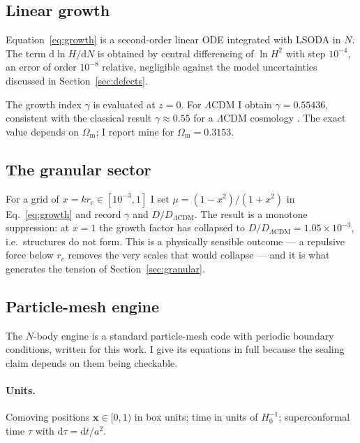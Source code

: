 \documentclass[11pt,a4paper]{article}
\theoremstyle{definition}
\newcommand{\Omm}{\Omega_{\mathrm{m}}}
\newcommand{\gamm}{\gamma}
\begin{document}
\subsection{Linear growth}

Equation~\eqref{eq:growth} is a second-order linear ODE integrated with LSODA
in $N$. The term $\mathrm{d}\ln H/\mathrm{d}N$ is obtained by central
differencing of $\ln H^2$ with step $10^{-4}$, an error of order $10^{-8}$
relative, negligible against the model uncertainties discussed in
Section~\ref{sec:defects}.

The growth index $\gamm$ is evaluated at $z = 0$. For $\Lambda$CDM I obtain
$\gamm = 0.55436$, consistent with the classical result $\gamm \approx 0.55$
for a $\Lambda$CDM cosmology \cite{peebles1993,lahav1991}. The exact value
depends on $\Omm$; I report mine for $\Omm = 0.3153$.

\subsection{The granular sector}

For a grid of $x = k r_c \in [10^{-3}, 1]$ I set
$\mu = (1-x^2)/(1+x^2)$ in Eq.~\eqref{eq:growth} and record $\gamm$ and
$D/D_{\Lambda\mathrm{CDM}}$. The result is a monotone suppression: at
$x = 1$ the growth factor has collapsed to
$D/D_{\Lambda\mathrm{CDM}} = 1.05\times10^{-3}$, i.e.\ structures do not
form. This is a physically sensible outcome --- a repulsive force below
$r_c$ removes the very scales that would collapse --- and it is what
generates the tension of Section~\ref{sec:granular}.

\subsection{Particle-mesh engine}

The $N$-body engine is a standard particle-mesh code with periodic boundary
conditions, written for this work. I give its equations in full because the
sealing claim depends on them being checkable.

\paragraph{Units.} Comoving positions $\mathbf{x} \in [0,1)$ in box units;
time in units of $H_0^{-1}$; superconformal time $\tau$ with
$\mathrm{d}\tau = \mathrm{d}t/a^2$.
\end{document}
